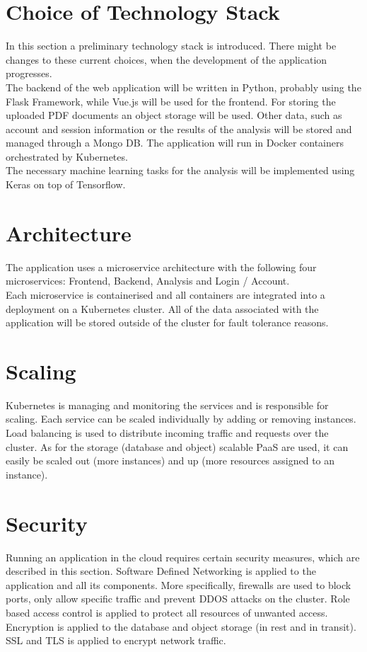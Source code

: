 \documentclass[conference]{IEEEtran}
\begin{document}
\section{Choice of Technology Stack}
In this section a  preliminary technology stack is introduced. There might be changes to these current
choices, when the development of the application progresses. \\
The backend of the web application will be written in Python, probably using the Flask Framework, 
while Vue.js will be used for the frontend.
For storing the uploaded PDF documents an object storage will be used. Other data, such as account and
session information or the results of the analysis will be stored and managed through a Mongo DB.
The application will run in Docker containers orchestrated by Kubernetes. \\
The necessary machine learning tasks for the analysis will be implemented using Keras on top of Tensorflow.

\section{Architecture}
The application uses a microservice architecture with the following four microservices: Frontend, Backend,
Analysis and Login / Account. \\
Each microservice is containerised and all containers are integrated into a deployment on a Kubernetes cluster.
All of the data associated with the application will be stored outside of the cluster for fault tolerance
reasons.

\section{Scaling}
Kubernetes is managing and monitoring the services and is responsible for scaling. Each service can be
scaled individually by adding or removing instances. \\
Load balancing is used to distribute incoming traffic and requests over the cluster.
As for the storage (database and object) scalable PaaS are used, it can easily be scaled out (more instances)
and up (more resources assigned to an instance).

\section{Security}
Running an application in the cloud requires certain security measures, which are described in this section.
Software Defined Networking is applied to the application and all its components. More specifically,
firewalls are used to block ports, only allow specific traffic and prevent DDOS attacks on the cluster.
Role based access control is applied to protect all resources of unwanted access. \\
Encryption is applied to the database and object storage (in rest and in transit). SSL and TLS is
applied to encrypt network traffic.
\end{document}
